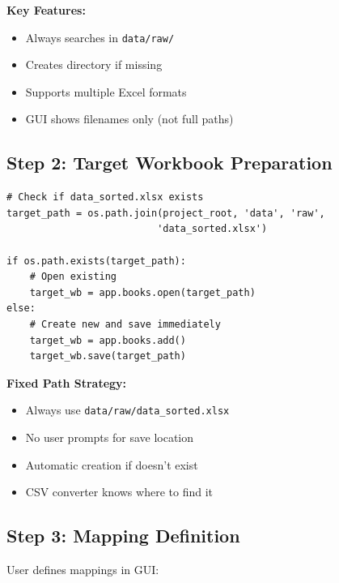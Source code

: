 \textbf{Key Features:}
\begin{itemize}
    \item Always searches in \texttt{data/raw/}
    \item Creates directory if missing
    \item Supports multiple Excel formats
    \item GUI shows filenames only (not full paths)
\end{itemize}

\subsection{Step 2: Target Workbook Preparation}

\begin{lstlisting}[style=pythonstyle]
# Check if data_sorted.xlsx exists
target_path = os.path.join(project_root, 'data', 'raw', 
                          'data_sorted.xlsx')

if os.path.exists(target_path):
    # Open existing
    target_wb = app.books.open(target_path)
else:
    # Create new and save immediately
    target_wb = app.books.add()
    target_wb.save(target_path)
\end{lstlisting}

\textbf{Fixed Path Strategy:}
\begin{itemize}
    \item Always use \texttt{data/raw/data\_sorted.xlsx}
    \item No user prompts for save location
    \item Automatic creation if doesn't exist
    \item CSV converter knows where to find it
\end{itemize}

\subsection{Step 3: Mapping Definition}

User defines mappings in GUI:

